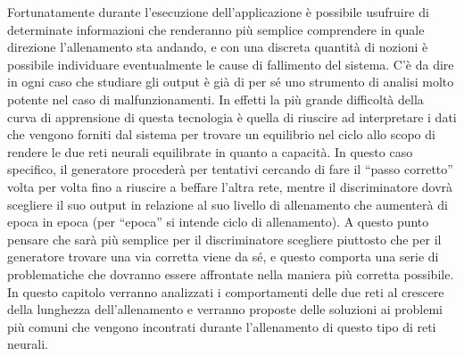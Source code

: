 Fortunatamente durante l’esecuzione dell’applicazione è possibile usufruire di determinate informazioni che renderanno più semplice comprendere in quale direzione l’allenamento sta andando, e con una discreta quantità di nozioni è possibile individuare eventualmente le cause di fallimento del sistema. C’è da dire in ogni caso che studiare gli output è già di per sé uno strumento di analisi molto potente nel caso di malfunzionamenti. In effetti la più grande difficoltà della curva di apprensione di questa tecnologia è quella di riuscire ad interpretare i dati che vengono forniti dal sistema per trovare un equilibrio nel ciclo allo scopo di rendere le due reti neurali equilibrate in quanto a capacità. 
In questo caso specifico, il generatore procederà per tentativi cercando di fare il “passo corretto” volta per volta fino a riuscire a beffare l’altra rete, mentre il discriminatore dovrà scegliere il suo output in relazione al suo livello di allenamento che aumenterà di epoca in epoca (per “epoca” si intende ciclo di allenamento). A questo punto pensare che sarà più semplice per il discriminatore scegliere piuttosto che per il generatore trovare una via corretta viene da sé, e questo comporta una serie di problematiche che dovranno essere affrontate nella maniera più corretta possibile. In questo capitolo verranno analizzati i comportamenti delle due reti al crescere della lunghezza dell’allenamento e verranno proposte delle soluzioni ai problemi più comuni che vengono incontrati durante l’allenamento di questo tipo di reti neurali. 
